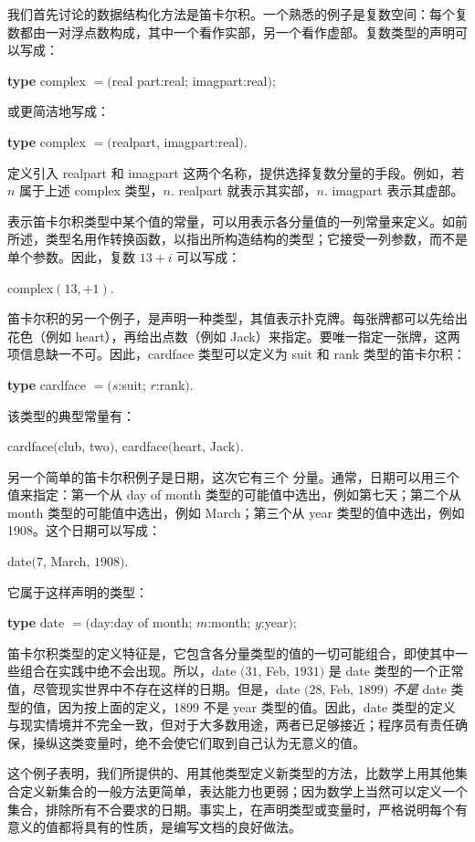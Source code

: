 我们首先讨论的数据结构化方法是笛卡尔积。一个熟悉的例子是复数空间：每个复数都由一对浮点数构成，其中一个看作实部，另一个看作虚部。复数类型的声明可以写成：

\quad \textbf{type} complex $= ($real part:real; imagpart:real$)$;
\nopagebreak

\noindent
或更简洁地写成：
\nopagebreak

\quad \textbf{type} complex $= ($realpart, imagpart:real$)$.

定义引入 realpart 和 imagpart 这两个名称，提供选择复数分量的手段。例如，若 $n$ 属于上述 complex 类型，$n$. realpart 就表示其实部，$n$. imagpart 表示其虚部。

表示笛卡尔积类型中某个值的常量，可以用表示各分量值的一列常量来定义。如前所述，类型名用作转换函数，以指出所构造结构的类型；它接受一列参数，而不是单个参数。因此，复数 $13 + i$ 可以写成：

\quad complex$(13, + 1)$.

\noindent
笛卡尔积的另一个例子，是声明一种类型，其值表示扑克牌。每张牌都可以先给出花色（例如 heart），再给出点数（例如 Jack）来指定。要唯一指定一张牌，这两项信息缺一不可。因此，cardface 类型可以定义为 suit 和 rank 类型的笛卡尔积：

\quad \textbf{type} cardface $= (s$:suit; $r$:rank$)$.

该类型的典型常量有：

\quad cardface$($club, two$)$, cardface$($heart, Jack$)$.

另一个简单的笛卡尔积例子是日期，这次它有三个
分量。通常，日期可以用三个
值来指定：第一个从 day of
month 类型的可能值中选出，例如第七天；第二个从
month 类型的可能值中选出，例如 March；第三个从
year 类型的值中选出，例如 1908。这个日期可以写成：

\quad date$(7$, March, $1908)$.

\noindent
它属于这样声明的类型：

\quad \textbf{type} date $= ($day:day of month; $m$:month; $y$:year$)$;

笛卡尔积类型的定义特征是，它包含各分量类型的值的一切可能组合，即使其中一些组合在实践中绝不会出现。所以，date $(31$, Feb, $1931)$ 是 date 类型的一个正常值，尽管现实世界中不存在这样的日期。但是，date $(28$, Feb, $1899)$ \textit{不是} date 类型的值，因为按上面的定义，1899 不是 year 类型的值。因此，date 类型的定义与现实情境并不完全一致，但对于大多数用途，两者已足够接近；程序员有责任确保，操纵这类变量时，绝不会使它们取到自己认为无意义的值。

这个例子表明，我们所提供的、用其他类型定义新类型的方法，比数学上用其他集合定义新集合的一般方法更简单，表达能力也更弱；因为数学上当然可以定义一个集合，排除所有不合要求的日期。事实上，在声明类型或变量时，严格说明每个有意义的值都将具有的性质，是编写文档的良好做法。
 
